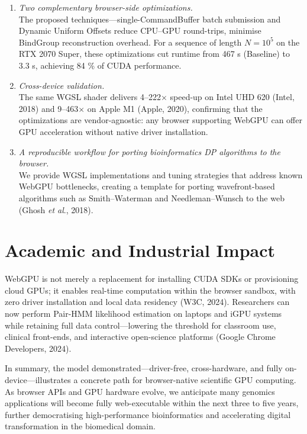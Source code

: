\documentclass[PhD]{PHlab-thesis}
\begin{document}
\begin{enumerate}
    \item \emph{Two complementary browser-side optimizations.} \\
    The proposed techniques—single-CommandBuffer batch submission and Dynamic Uniform Offsets reduce CPU–GPU round-trips, minimise BindGroup reconstruction overhead. For a sequence of length $N = 10^{5}$ on the RTX 2070 Super, these optimizations cut runtime from 467 s (Baseline) to 3.3 s, achieving 84 \% of CUDA performance.

    \item \emph{Cross-device validation.} \\
    The same WGSL shader delivers 4–222$\times$ speed-up on Intel UHD 620 (Intel, 2018) and 9–463$\times$ on Apple M1 (Apple, 2020), confirming that the optimizations are vendor-agnostic: any browser supporting WebGPU can offer GPU acceleration without native driver installation.

    \item \emph{A reproducible workflow for porting bioinformatics DP algorithms to the browser.} \\
    We provide WGSL implementations and tuning strategies that address known WebGPU bottlenecks, creating a template for porting wavefront-based algorithms such as Smith–Waterman and Needleman–Wunsch to the web (Ghosh \emph{et al}., 2018).
\end{enumerate}

\section{Academic and Industrial Impact}

WebGPU is not merely a replacement for installing CUDA SDKs or provisioning cloud GPUs; it enables real-time computation within the browser sandbox, with zero driver installation and local data residency (W3C, 2024). Researchers can now perform Pair-HMM likelihood estimation on laptops and iGPU systems while retaining full data control—lowering the threshold for classroom use, clinical front-ends, and interactive open-science platforms (Google Chrome Developers, 2024).

In summary, the model demonstrated—driver-free, cross-hardware, and fully on-device—illustrates a concrete path for browser-native scientific GPU computing. As browser APIs and GPU hardware evolve, we anticipate many genomics applications will become fully web-executable within the next three to five years, further democratising high-performance bioinformatics and accelerating digital transformation in the biomedical domain.
\end{document}
